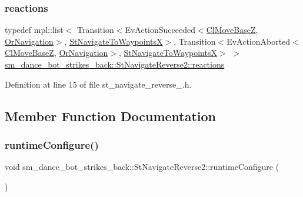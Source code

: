 \subsubsection{\texorpdfstring{reactions}{reactions}}
{\footnotesize\ttfamily typedef mpl\+::list$<$ Transition$<$Ev\+Action\+Succeeded$<$\hyperlink{classmove__base__z__client_1_1ClMoveBaseZ}{Cl\+Move\+BaseZ}, \hyperlink{classsm__dance__bot__strikes__back_1_1OrNavigation}{Or\+Navigation}$>$, \hyperlink{structsm__dance__bot__strikes__back_1_1StNavigateToWaypointsX}{St\+Navigate\+To\+WaypointsX}$>$, Transition$<$Ev\+Action\+Aborted$<$\hyperlink{classmove__base__z__client_1_1ClMoveBaseZ}{Cl\+Move\+BaseZ}, \hyperlink{classsm__dance__bot__strikes__back_1_1OrNavigation}{Or\+Navigation}$>$, \hyperlink{structsm__dance__bot__strikes__back_1_1StNavigateToWaypointsX}{St\+Navigate\+To\+WaypointsX}$>$ $>$ \hyperlink{structsm__dance__bot__strikes__back_1_1StNavigateReverse2_a10192cd09cb494f317679544904218ee}{sm\+\_\+dance\+\_\+bot\+\_\+strikes\+\_\+back\+::\+St\+Navigate\+Reverse2\+::reactions}}



Definition at line 15 of file st\+\_\+navigate\+\_\+reverse\+\_.\+h.



\subsection{Member Function Documentation}
\mbox{\label{structsm__dance__bot__strikes__back_1_1StNavigateReverse2_ad78e89f37ed4b62ffe22d6cb1c1f18ca}} 
\subsubsection{\texorpdfstring{runtime\+Configure()}{runtimeConfigure()}}
{\footnotesize\ttfamily void sm\+\_\+dance\+\_\+bot\+\_\+strikes\+\_\+back\+::\+St\+Navigate\+Reverse2\+::runtime\+Configure (\begin{DoxyParamCaption}{ }\end{DoxyParamCaption})\hspace{0.3cm}{\ttfamily [inline]}}




